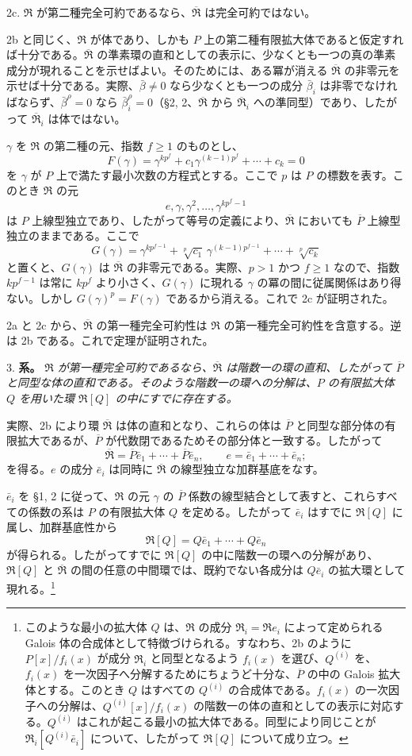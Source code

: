 \documentclass[11pt]{article}
\providecommand{\mR}{\mathfrak{R}}
\providecommand{\bR}{\overline{\mathfrak{R}}}
\providecommand{\bP}{\overline{P}}
\begin{document}
2c. $\mR$ が第二種完全可約であるなら、$\bR$ は完全可約ではない。

2b と同じく、$\mR$ が体であり、しかも $P$ 上の第二種有限拡大体であると仮定すれば十分である。$\bR$ の準素環の直和としての表示に、少なくとも一つの真の準素成分が現れることを示せばよい。そのためには、ある冪が消える $\bR$ の非零元を示せば十分である。実際、$\bar\beta\ne0$ なら少なくとも一つの成分 $\bar\beta_i$ は非零でなければならず、$\bar\beta^\rho=0$ なら $\bar\beta_i^\rho=0$（\S 2, 2、$\bR$ から $\bR_i$ への準同型）であり、したがって $\bR_i$ は体ではない。

$\gamma$ を $\mR$ の第二種の元、指数 $f\ge1$ のものとし、
\[
        F(\gamma)=\gamma^{kp^f}+c_1\gamma^{(k-1)p^f}+\cdots+c_k=0
\]
を $\gamma$ が $P$ 上で満たす最小次数の方程式とする。ここで $p$ は $P$ の標数を表す。このとき $\mR$ の元
\[
        e,\gamma,\gamma^2,\ldots,\gamma^{kp^f-1}
\]
は $P$ 上線型独立であり、したがって等号の定義により、$\bR$ においても $\bP$ 上線型独立のままである。ここで
\[
        G(\gamma)=\gamma^{kp^{f-1}}+\sqrt[p]{c_1}\,\gamma^{(k-1)p^{f-1}}+
        \cdots+\sqrt[p]{c_k}
\]
と置くと、$G(\gamma)$ は $\bR$ の非零元である。実際、$p>1$ かつ $f\ge1$ なので、指数 $kp^{f-1}$ は常に $kp^f$ より小さく、$G(\gamma)$ に現れる $\gamma$ の冪の間に従属関係はあり得ない。しかし $G(\gamma)^p=F(\gamma)$ であるから消える。これで 2c が証明された。

2a と 2c から、$\bR$ の第一種完全可約性は $\mR$ の第一種完全可約性を含意する。逆は 2b である。これで定理が証明された。

3. \textbf{系。} \emph{$\mR$ が第一種完全可約であるなら、$\bR$ は階数一の環の直和、したがって $\bP$ と同型な体の直和である。そのような階数一の環への分解は、$P$ の有限拡大体 $Q$ を用いた環 $\mR[Q]$ の中にすでに存在する。}

実際、2b により環 $\bR$ は体の直和となり、これらの体は $\bP$ と同型な部分体の有限拡大であるが、$\bP$ が代数閉であるためその部分体と一致する。したがって
\[
        \bR=\bP\bar e_1+\cdots+\bP\bar e_n,
        \qquad e=\bar e_1+\cdots+\bar e_n;
\]
を得る。$e$ の成分 $\bar e_i$ は同時に $\bR$ の線型独立な加群基底をなす。

$\bar e_i$ を \S 1, 2 に従って、$\mR$ の元 $\gamma$ の $\bP$ 係数の線型結合として表すと、これらすべての係数の系は $P$ の有限拡大体 $Q$ を定める。したがって $\bar e_i$ はすでに $\mR[Q]$ に属し、加群基底性から
\[
        \mR[Q]=Q\bar e_1+\cdots+Q\bar e_n
\]
が得られる。したがってすでに $\mR[Q]$ の中に階数一の環への分解があり、$\mR[Q]$ と $\bR$ の間の任意の中間環では、既約でない各成分は $Q\bar e_i$ の拡大環として現れる。\footnote{このような最小の拡大体 $Q$ は、$\mR$ の成分 $\mR_i=\mR e_i$ によって定められる Galois 体の合成体として特徴づけられる。すなわち、2b のように $P[x]/f_i(x)$ が成分 $\mR_i$ と同型となるよう $f_i(x)$ を選び、$Q^{(i)}$ を、$f_i(x)$ を一次因子へ分解するためにちょうど十分な、$\bP$ の中の Galois 拡大体とする。このとき $Q$ はすべての $Q^{(i)}$ の合成体である。$f_i(x)$ の一次因子への分解は、$Q^{(i)}[x]/f_i(x)$ の階数一の体の直和としての表示に対応する。$Q^{(i)}$ はこれが起こる最小の拡大体である。同型により同じことが $\mR_i[Q^{(i)}\bar e_i]$ について、したがって $\mR[Q]$ について成り立つ。}
\end{document}
